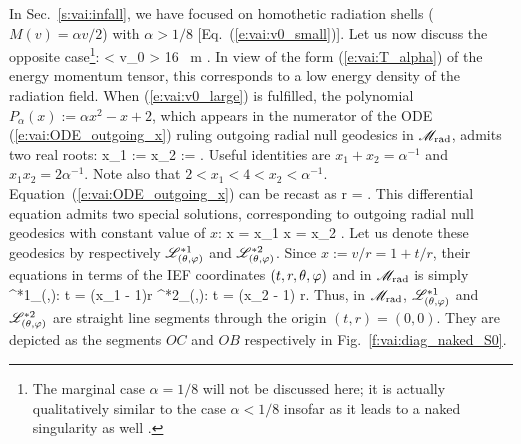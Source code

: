 In Sec.~\ref{s:vai:infall}, we have focused on homothetic radiation shells
($M(v) = \alpha v / 2$) with
$\alpha > 1/8$ [Eq.~(\ref{e:vai:v0_small})].
Let us now discuss the opposite case\footnote{The marginal case $\alpha = 1/8$
will not be discussed here; it is actually qualitatively similar to the
case $\alpha < 1/8$ insofar as it leads to a naked singularity as well \cite{Papap85}.}:
\be \label{e:vai:v0_large}
    \alpha <  \iff v_0 > 16 \, m .
\ee
In view of the form (\ref{e:vai:T_alpha}) of the energy momentum tensor, this
corresponds to a low energy density of the radiation field. When (\ref{e:vai:v0_large})
is fulfilled, the polynomial $P_\alpha(x) := \alpha x^2 - x + 2$, which appears in the
numerator of the ODE (\ref{e:vai:ODE_outgoing_x}) ruling outgoing radial null geodesics
in $\mathscr{M}_{\rm rad}$,
admits two real roots:
\be \label{e:vai:x1_x2}
    x_1 := 
    \qand
    x_2 :=  .
\ee
Useful identities are $x_1 + x_2 = \alpha^{-1}$ and $x_1 x_2 = 2\alpha^{-1}$.
Note also that $2 < x_1 < 4 < x_2 < \alpha^{-1}$.
Equation~(\ref{e:vai:ODE_outgoing_x}) can be recast as
\be \label{e:vai:ODE_outgoing_x_naked}
    r  =  .
\ee
This differential equation admits two special solutions, corresponding
to outgoing radial null geodesics with constant value of $x$:
\be
    x = x_1  \qand x = x_2 .
\ee
Let us denote these geodesics by respectively
$\mathscr{L}^{*1}_{(\theta,\varphi)}$ and $\mathscr{L}^{*2}_{(\theta,\varphi)}$.
Since $x := v/r = 1 + t/r$, their equations in terms of the IEF
coordinates $(t, r, \theta, \varphi)$ and in $\mathscr{M}_{\rm rad}$ is simply
\be
    \Li^{*1}_{(\th,\ph)}: \quad t = (x_1 - 1)r
    \qand
    \Li^{*2}_{(\th,\ph)}: t = (x_2 - 1) r.
\ee
Thus, in $\mathscr{M}_{\rm rad}$,
$\mathscr{L}^{*1}_{(\theta,\varphi)}$ and $\mathscr{L}^{*2}_{(\theta,\varphi)}$ are straight line segments
through the origin $(t, r) = (0,0)$. They are depicted
as the segments $OC$ and $OB$ respectively in Fig.~\ref{f:vai:diag_naked_S0}.

